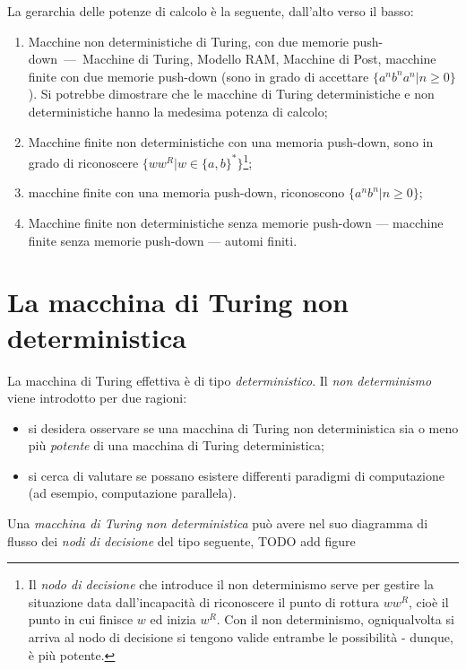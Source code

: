 \documentclass[10pt]{book}
\begin{document}
La gerarchia delle potenze di calcolo è la seguente, dall'alto verso il basso:
\begin{enumerate}
    \item Macchine non deterministiche di Turing, con due memorie
        push-down~\----~Macchine di Turing, Modello RAM, Macchine di Post,
        macchine finite con due memorie push-down (sono in grado di accettare
        $\{a^n b^n a^n| n \geq 0\}$). Si potrebbe dimostrare che le macchine di
        Turing deterministiche e non deterministiche hanno la medesima potenza
        di calcolo; 
    \item Macchine finite non deterministiche con una memoria push-down, sono
        in grado di riconoscere $\{w w^R | w\in\{a,b\}^*\}$\footnote{Il
        \emph{nodo di decisione} che introduce il non determinismo serve per
    gestire la situazione data dall'incapacità di riconoscere il punto di
rottura $ww^R$, cioè il punto in cui finisce $w$ ed inizia $w^R$. Con il non
determinismo, ogniqualvolta si arriva al nodo di decisione si tengono valide
entrambe le possibilità \-- dunque, è più potente.};
    \item macchine finite con una memoria push-down, riconoscono $\{a^n
        b^n|n\geq 0\}$;
    \item Macchine finite non deterministiche senza memorie push-down \----
        macchine finite senza memorie push-down \---- automi finiti.
\end{enumerate}

\section{La macchina di Turing non deterministica}

La macchina di Turing effettiva è di tipo \emph{deterministico}. Il \emph{non determinismo} viene introdotto per due ragioni:
\begin{itemize}
    \item si desidera osservare se una macchina di Turing non deterministica
        sia o meno più \emph{potente} di una macchina di Turing deterministica;
    \item si cerca di valutare se possano esistere differenti paradigmi di
        computazione (ad esempio, computazione parallela).
\end{itemize}

Una \emph{macchina di Turing non deterministica} può avere nel suo diagramma di flusso dei \emph{nodi di decisione} del tipo seguente, TODO add figure
\end{document}
